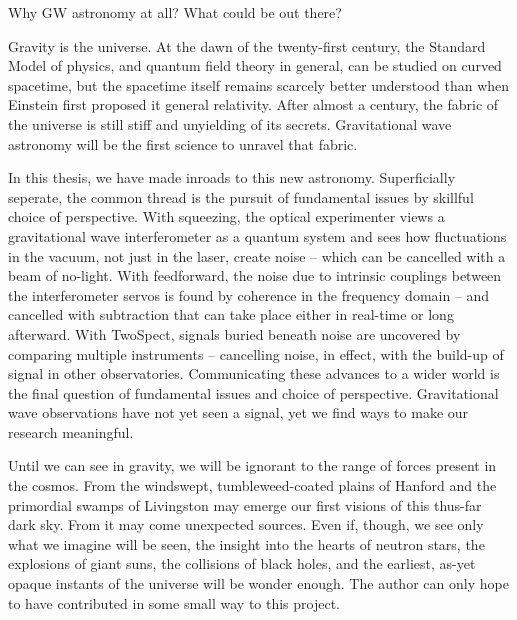         Why GW astronomy at all? What could be out there?

        Gravity is the universe. At the dawn of the twenty-first century, the Standard Model of physics, and quantum field theory in general, can be studied on curved spacetime, but the spacetime itself remains scarcely better understood than when Einstein first proposed it general relativity. After almost a century, the fabric of the universe is still stiff and unyielding of its secrets. Gravitational wave astronomy will be the first science to unravel that fabric. 

        In this thesis, we have made inroads to this new astronomy. Superficially seperate, the common thread is the pursuit of fundamental issues by skillful choice of perspective. 
With squeezing, the optical experimenter views a gravitational wave interferometer as a quantum system and sees how fluctuations in the vacuum, not just in the laser, create noise -- which can be cancelled with a beam of no-light.
With feedforward, the noise due to intrinsic couplings between the interferometer servos is found by coherence in the frequency domain -- and cancelled with subtraction that can take place either in real-time or long afterward.
With TwoSpect, signals buried beneath noise are uncovered by comparing multiple instruments -- cancelling noise, in effect, with the build-up of signal in other observatories.
Communicating these advances to a wider world is the final question of fundamental issues and choice of perspective.
Gravitational wave observations have not yet seen a signal, yet we find ways to make our research meaningful.

Until we can see in gravity, we will be ignorant to the range of forces present in the cosmos. From the windswept, tumbleweed-coated plains of Hanford and the primordial swamps of Livingston may emerge our first visions of this thus-far dark sky. From it may come unexpected sources. Even if, though, we see only what we imagine will be seen, the insight into the hearts of neutron stars, the explosions of giant suns, the collisions of black holes, and the earliest, as-yet opaque instants of the universe will be wonder enough. The author can only hope to have contributed in some small way to this project. 

  

